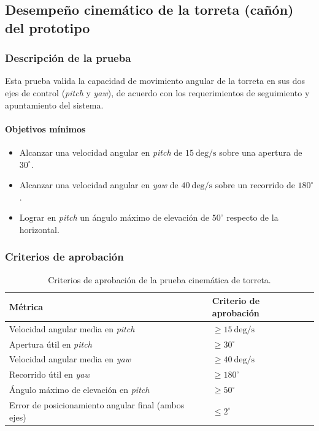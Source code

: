 \subsection{Desempeño cinemático de la torreta (cañón) del prototipo}

\subsubsection{Descripción de la prueba}

Esta prueba valida la capacidad de movimiento angular de la torreta en sus dos ejes de control (\textit{pitch} y \textit{yaw}), de acuerdo con los requerimientos de seguimiento y apuntamiento del sistema.

\paragraph{Objetivos mínimos}
\begin{itemize}
    \item Alcanzar una velocidad angular en \textit{pitch} de $15\ \text{deg/s}$ sobre una apertura de $30^\circ$.
    \item Alcanzar una velocidad angular en \textit{yaw} de $40\ \text{deg/s}$ sobre un recorrido de $180^\circ$.
    \item Lograr en \textit{pitch} un ángulo máximo de elevación de $50^\circ$ respecto de la horizontal.
\end{itemize}

\subsubsection{Criterios de aprobación}

\begin{table}[H]
\centering
\small
\begin{tabular}{p{8.8cm} p{4.1cm}}
\toprule
\textbf{Métrica} & \textbf{Criterio de aprobación} \\
\midrule
Velocidad angular media en \textit{pitch} & $\geq 15\ \text{deg/s}$ \\
Apertura útil en \textit{pitch} & $\geq 30^\circ$ \\
Velocidad angular media en \textit{yaw} & $\geq 40\ \text{deg/s}$ \\
Recorrido útil en \textit{yaw} & $\geq 180^\circ$ \\
Ángulo máximo de elevación en \textit{pitch} & $\geq 50^\circ$ \\
Error de posicionamiento angular final (ambos ejes) & $\leq 2^\circ$ \\
\bottomrule
\end{tabular}
\caption{Criterios de aprobación de la prueba cinemática de torreta.}
\label{tab:criterios_prueba_canon}
\end{table}

